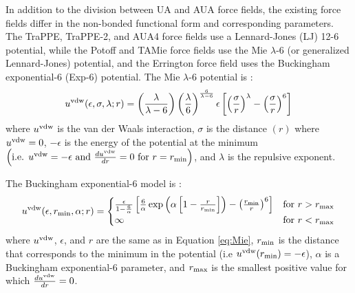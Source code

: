 \documentclass[preprint,letterpaper,floatfix,citeautoscript,aip,jcp]{revtex4-1}
\begin{document}
%

In addition to the 
division between
UA and AUA force fields, the existing force fields differ in the non-bonded functional form and corresponding parameters. The TraPPE, TraPPE-2, and AUA4 force fields use a Lennard-Jones (LJ) 12-6 potential, while the Potoff and TAMie force fields use the Mie $\lambda$-6 (or generalized Lennard-Jones) potential, and the Errington force field uses the Buckingham exponential-6 (Exp-6) potential. 
The Mie $\lambda$-6 potential is \cite{Herdes2015}:
\begin{equation} \label{eq:Mie}
u^{\rm vdw}(\epsilon,\sigma,\lambda;r) = \left(\frac{\lambda}{\lambda - 6}\right)\left(\frac{\lambda}{6}\right)^{\frac{6}{\lambda - 6}} \epsilon \left[\left(\frac{\sigma}{r}\right)^\lambda - \left(\frac{\sigma}{r}\right)^6\right]
\end{equation} 
where $u^{\rm vdw}$ is the van der Waals interaction, $\sigma$ is the distance $(r)$ where $u^{\rm vdw} = 0$, $-\epsilon$ is the energy of the potential at the minimum $\left(\text{i.e. }u^{\rm vdw} = -\epsilon \text{ and } \frac{d u^{\rm vdw}}{d r} = 0 \text{ for } r=r_{\rm min} \right)$, and $\lambda$ is the repulsive exponent. 

The Buckingham exponential-6 model is \cite{Exp6}:
\begin{equation} \label{eq:Buckingham}
u^{\rm vdw}(\epsilon,r_{\rm min},\alpha;r) = 
\begin{cases}
\frac{\epsilon}{1-\frac{6}{\alpha}} \left[\frac{6}{\alpha} \exp\left(\alpha\left[1-\frac{r}{r_{\rm min}}\right]\right) - \left(\frac{r_{\rm min}}{r}\right)^6\right] & \text{for}\ r>r_{\rm max} \\
\infty           & \text{for}\ r<r_{\rm max}
\end{cases}
\end{equation}
where $u^{\rm vdw}$, $\epsilon$, and $r$ are the same as in Equation \ref{eq:Mie}, $r_{\rm min}$ is the distance that corresponds to the minimum in the potential (i.e $u^{\rm vdw}(r_{\rm min})=-\epsilon$), $\alpha$ is a Buckingham exponential-6 parameter, and $r_{\rm max}$ is the smallest positive value for which $\frac{du^{\rm vdw}}{dr}=0$.
\end{document}
